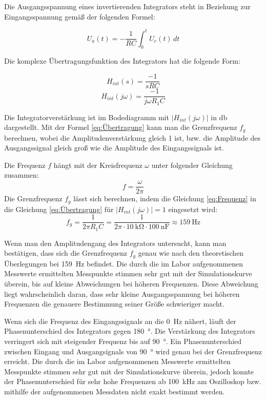 Die Ausgangsspannung eines invertierenden Integrators steht in Beziehung zur Eingangsspannung gemäß der folgenden Formel\cite{Skript}:

\begin{equation}
U_a(t) = -\frac{1}{RC} \int_{0}^{t} U_e(t) \, dt
\end{equation}


Die komplexe Übertragungsfunktion des Integrators hat die folgende Form:

\begin{equation*}
    H_{int}(s)=\frac{-1}{sRC} 
\end{equation*}
\begin{equation}
\label{eq:Übertragung}
   H_{int}(j\omega)=\frac{-1}{j\omega R_1C}
\end{equation}

Die Integratorverstärkung ist im Bodediagramm mit \( \left| H_{int}(j\omega) \right| \) in \si{\decibel} dargestellt. Mit der Formel \ref{eq:Übertragung} kann man die Grenzfrequenz $f_g$ berechnen, wobei die Amplitudenverstärkung gleich 1 ist, bzw. die Amplitude des Ausgangssignal gleich groß wie die Amplitude des Eingangssignals ist.

Die Frequenz $f$ hängt mit der Kreisfrequenz $\omega$ unter folgender Gleichung zusammen:
\begin{equation}
\label{eq:Frequenz}
    f=\frac{\omega}{2\pi}
\end{equation}
Die Grenzfrequenz $f_g$ lässt sich berechnen, indem die Gleichung \ref{eq:Frequenz} in die Gleichung \ref{eq:Übertragung} für \( \left| H_{int}(j\omega) \right| \)$=1$ eingesetzt wird:
\begin{equation*}
 f_g=\frac{1}{2\pi R_1C}=\frac{1}{2\pi \cdot \SI{10}{\kilo\ohm} \cdot \SI{100}{\nano\farad}}\approx \SI{159}{\hertz}  
\end{equation*}

Wenn man den Amplitudengang des Integrators untersucht, kann man bestätigen, dass sich die Grenzfrequenz $f_g$ genau wie nach den theoretischen Überlegungen bei  \SI{159}{\hertz} befindet. Die durch die im Labor aufgenommenen Messwerte ermittelten Messpunkte stimmen sehr gut mit der Simulationskurve überein, bis auf kleine Abweichungen bei höheren Frequenzen. Diese Abweichung liegt wahrscheinlich daran, dass sehr kleine Ausgangsspannung bei höheren Frequenzen die genauere Bestimmung seiner Größe schwieriger macht.

 Wenn sich die Frequenz des Eingangssignals an die \SI{0}{\hertz} nähert, läuft der Phasenunterschied des Integrators gegen \SI{180}{\degree}. Die Verstärkung des Integrators verringert sich mit steigender Frequenz bis auf \SI{90}{\degree}. Ein Phasenunterschied zwischen Eingang und Ausgangsignals  von \SI{90}{\degree} wird genau bei der Grenzfrequenz erreicht. Die durch die im Labor aufgenommenen Messwerte ermittelten Messpunkte stimmen sehr gut mit der Simulationskurve überein, jedoch konnte der Phasenunterschied für sehr hohe Frequenzen ab \SI{100}{\kilo\hertz} am Oszilloskop bzw. mithilfe der aufgenommenen Messdaten nicht exakt bestimmt werden.

